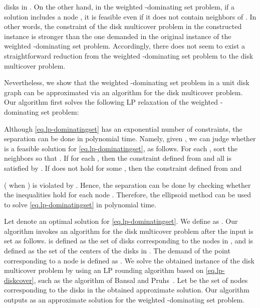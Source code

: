 \documentclass[11pt]{article}
\begin{document}
disks in . On the other hand, in the weighted -dominating set problem,
if a solution includes
a node ,
it is feasible even if
it does not contain  neighbors of .
In other words, the constraint of the disk multicover problem
in the constructed instance is stronger than the one demanded in the original
instance of the weighted -dominating set problem.
Accordingly, there does not seem to exist a straightforward reduction
from the weighted -dominating set problem to the disk multicover problem.

Nevertheless, we show that
the weighted -dominating set problem in a unit disk graph
can be approximated via an algorithm for 
the disk multicover problem.
Our algorithm first solves the following LP relaxation of the
weighted -dominating set problem:


Although \eqref{eq.lp-dominatingset}  has an exponential number
of constraints, the separation can be done in polynomial time.
Namely, given , we can judge whether  is a feasible solution for
\eqref{eq.lp-dominatingset}, as follows.
For each , sort the neighbors  so that
.
If   for each
,
then the constraint defined from  and all  is
satisfied by .
If  does not hold for some
,
then the constraint defined from  and

( when )
is
violated by .
Hence, the separation can be done by checking whether the 
inequalities hold for each node .
Therefore, the ellipsoid method can be used to solve \eqref{eq.lp-dominatingset} in polynomial time.

Let  denote an optimal solution for \eqref{eq.lp-dominatingset}.
We define  as .
Our algorithm invokes
an algorithm for the disk multicover problem after the input is set as follows.
 is defined as
the set of disks corresponding to the nodes in ,
and  is defined as the set of the centers of the disks in .
The demand  of the point 
corresponding to a node 
is defined as .
We solve the obtained instance of the disk multicover problem
by using an LP rounding algorithm based on \eqref{eq.lp-diskcover}, such as
the algorithm of Bansal and Pruhs~\cite{Bansal:2012ik}.
Let  be the set of nodes corresponding to the disks in the obtained approximate solution.
Our algorithm outputs  as an approximate
solution for the weighted -dominating set problem.
\end{document}

